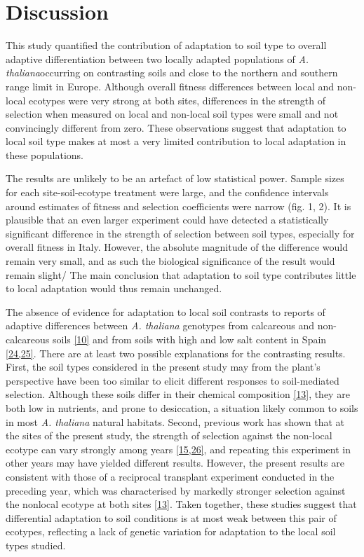 \documentclass[twocolumn,twoside,lettersize]{article}
\begin{document}
\section*{Discussion}

This study quantified the contribution of adaptation to soil type to overall adaptive differentiation between two locally adapted populations of \textit{A. thaliana}occurring on contrasting soils and close to the northern and southern range limit in Europe. Although overall fitness differences between local and non-local ecotypes were very strong at both sites, differences in the strength of selection when measured on local and non-local soil types were small and not convincingly different from zero. These observations suggest that adaptation to local soil type makes at most a very limited contribution to local adaptation in these populations.

The results are unlikely to be an artefact of low statistical power. Sample sizes for each site-soil-ecotype treatment were large, and the confidence intervals around estimates of fitness and selection coefficients were narrow (fig. 1, 2). It is plausible that an even larger experiment could have detected a statistically significant difference in the strength of selection between soil types, especially for overall fitness in Italy. However, the absolute magnitude of the difference would remain very small, and as such the biological significance of the result would remain slight/ The main conclusion that adaptation to soil type contributes little to local adaptation would thus remain unchanged.

The absence of evidence for adaptation to local soil contrasts to reports of adaptive differences between \textit{A. thaliana} genotypes from calcareous and non-calcareous soils \href{https://paperpile.com/c/ktzZ5s/bufo}{[10]} and from soils with high and low salt content in Spain \href{https://paperpile.com/c/ktzZ5s/sIWw+ZoA1}{[24,25]}. There are at least two possible explanations for the contrasting results. First, the soil types considered in the present study may from the plant’s perspective have been too similar to elicit different responses to soil-mediated selection. Although  these soils differ in their chemical composition \href{https://paperpile.com/c/ktzZ5s/1D9V}{[13]}, they are both low in nutrients, and prone to desiccation, a situation likely common to soils in most \textit{A. thaliana }natural habitats. Second, previous work has shown that at the sites of the present study, the strength of selection against the non-local ecotype can vary strongly among years \href{https://paperpile.com/c/ktzZ5s/YZ2m+dkgT}{[15,26]}, and repeating this experiment in other years may have yielded different results. However, the present results are consistent with those of a reciprocal transplant experiment conducted in the preceding year, which was characterised by markedly stronger selection against the nonlocal ecotype at both sites \href{https://paperpile.com/c/ktzZ5s/1D9V}{[13]}. Taken together, these studies suggest that differential adaptation to soil conditions is at most weak between this pair of ecotypes, reflecting a lack of genetic variation for adaptation to the local soil types studied.
\end{document}
